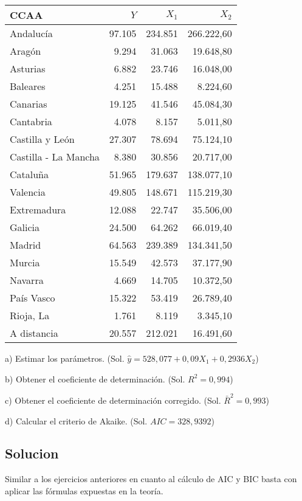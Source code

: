 \documentclass[a4paper,12pt]{article}
\begin{document}
\begin{table}[h!]
\centering
\begin{tabular}{|l|r|r|r|}
\hline
CCAA & \(Y\) & \(X_1\) & \(X_2\) \\
\hline
Andalucía & 97.105 & 234.851 & 266.222,60 \\
Aragón & 9.294 & 31.063 & 19.648,80 \\
Asturias & 6.882 & 23.746 & 16.048,00 \\
Baleares & 4.251 & 15.488 & 8.224,60 \\
Canarias & 19.125 & 41.546 & 45.084,30 \\
Cantabria & 4.078 & 8.157 & 5.011,80 \\
Castilla y León & 27.307 & 78.694 & 75.124,10 \\
Castilla - La Mancha & 8.380 & 30.856 & 20.717,00 \\
Cataluña & 51.965 & 179.637 & 138.077,10 \\
Valencia & 49.805 & 148.671 & 115.219,30 \\
Extremadura & 12.088 & 22.747 & 35.506,00 \\
Galicia & 24.500 & 64.262 & 66.019,40 \\
Madrid & 64.563 & 239.389 & 134.341,50 \\
Murcia & 15.549 & 42.573 & 37.177,90 \\
Navarra & 4.669 & 14.705 & 10.372,50 \\
País Vasco & 15.322 & 53.419 & 26.789,40 \\
Rioja, La & 1.761 & 8.119 & 3.345,10 \\
A distancia & 20.557 & 212.021 & 16.491,60 \\
\hline
\end{tabular}
\end{table}

a) Estimar los parámetros. (Sol. \(\hat{y} = 528,077 + 0,09X_1 + 0,2936X_2\))

b) Obtener el coeficiente de determinación. (Sol. \(R^2 = 0,994\))

c) Obtener el coeficiente de determinación corregido. (Sol. \(\bar{R}^2 = 0,993\))

d) Calcular el criterio de Akaike. (Sol. \(AIC = 328,9392\))

\subsection*{Solucion}
Similar a los ejercicios anteriores en cuanto al cálculo de AIC y BIC basta con aplicar las fórmulas expuestas en la teoría.
\end{document}
